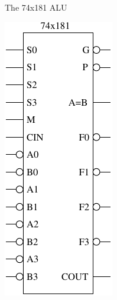 \begin{frame}{The 74x181 ALU}
  \begin{center}
    \includegraphics[scale=0.8]{74x181Schematic}
  \end{center}
\end{frame}


